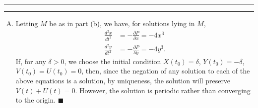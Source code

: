 \documentclass[11pt]{article}
\newcounter{questionCounter}
\newcounter{partCounter}[questionCounter]
\newenvironment{question}[2][\arabic{questionCounter}]{%
    \setcounter{partCounter}{0}%
    \vspace{.25in} \hrule \vspace{0.5em}%
        \noindent{\bf #2}%
    \vspace{0.8em} \hrule \vspace{.10in}%
    \addtocounter{questionCounter}{1}%
}{}
\renewcommand{\qed}{\quad $\blacksquare$}
\begin{document}
\begin{question}{Problem 4}
\begin{enumerate}[A)]
\item Letting $M$ be as in part (b), we have, for solutions lying in $M$,
\begin{align*}
\frac{d^2x}{dt^2} & = - \frac{\partial P}{\partial x} = -4x^3   \\
\frac{d^2y}{dt^2} & = - \frac{\partial P}{\partial y} = -4y^3.
\end{align*}
If, for any $\delta > 0$, we choose the initial condition $X(t_0) = \delta$,
$Y(t_0) = -\delta$, $V(t_0) = U(t_0) = 0$, then, since the negation of any
solution to each of the above equations is a solution, by uniqueness, the
solution will preserve $V(t) + U(t) = 0$. However, the solution is periodic
rather than converging to the origin. \qed
\end{enumerate}
\end{question}
\end{document}
